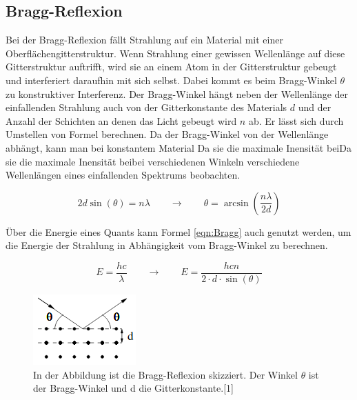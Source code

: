 \documentclass[titlepage = firstcover]{scrartcl}
\begin{document}
            \FloatBarrier



        \subsection{Bragg-Reflexion}
            Bei der Bragg-Reflexion fällt Strahlung auf ein Material mit einer Oberflächengitterstruktur. Wenn Strahlung einer gewissen Wellenlänge auf diese Gitterstruktur auftrifft, wird sie 
            an einem Atom in der Gitterstruktur gebeugt und interferiert daraufhin mit sich selbst. Dabei kommt es beim Bragg-Winkel $\theta$ zu konstruktiver Interferenz. Der Bragg-Winkel hängt
            neben der Wellenlänge der einfallenden Strahlung auch von der Gitterkonstante des Materials $d$ und der Anzahl der Schichten an denen das Licht gebeugt wird $n$ ab. Er lässt sich
            durch Umstellen von Formel berechnen. Da der Bragg-Winkel von der Wellenlänge abhängt, kann man bei konstantem Material Da sie die maximale Inensität beiDa sie die maximale Inensität beibei verschiedenen Winkeln verschiedene Wellenlängen eines 
            einfallenden Spektrums beobachten.

            \begin{equation}
              2d\sin(\theta) = n\lambda \qquad \longrightarrow \qquad \theta = \arcsin(\frac{n\lambda}{2d})
              \label{eqn:Bragg}
            \end{equation}

            \noindent
            Über die Energie eines Quants kann Formel \ref{eqn:Bragg} auch genutzt werden, um die Energie der Strahlung in Abhängigkeit vom Bragg-Winkel zu berechnen.
            
            \begin{equation}
              E = \frac{hc}{\lambda} \qquad \longrightarrow \qquad E = \frac{hcn}{2\cdot d \cdot \sin(\theta)}
              \label{eqn:Energie}
            \end{equation}

            \FloatBarrier

            \begin{figure}[h]
              \centering
              \includegraphics{skizzebragg.png}
              \caption{In der Abbildung ist die Bragg-Reflexion skizziert. Der Winkel $\theta$ ist der Bragg-Winkel und d die Gitterkonstante.[1]}
              \label{fig:SkizzeBragg}
            \end{figure}
\end{document}
